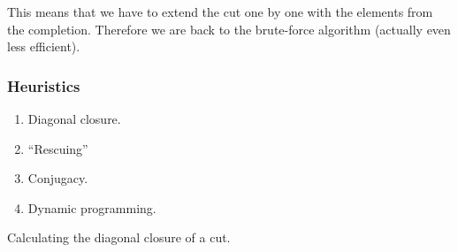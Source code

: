 \documentclass{beamer}
\newcommand{\jump}{\vskip6pt}
\begin{document}
\begin{frame}
\begin{center}
\begin{tabular}{@{}c@{}c@{}c@{}c@{}c@{}c@{}}
\end{tabular}%
\end{center} 

This means that we have to extend the cut one by one with the elements from the completion. Therefore we are back to the brute-force algorithm (actually even less efficient).
\end{frame}

\begin{frame}\frametitle{Heuristics}
\begin{enumerate}
\item Diagonal closure.
\item ``Rescuing''
\item Conjugacy.
\item Dynamic programming.
\end{enumerate}
\end{frame}

\begin{frame}[fragile]
\begin{algorithm}[H]
\caption{Calculating the diagonal closure of a cut.}
\label{alg:diagonalclosure}
\end{algorithm}
\end{frame}
\end{document}
